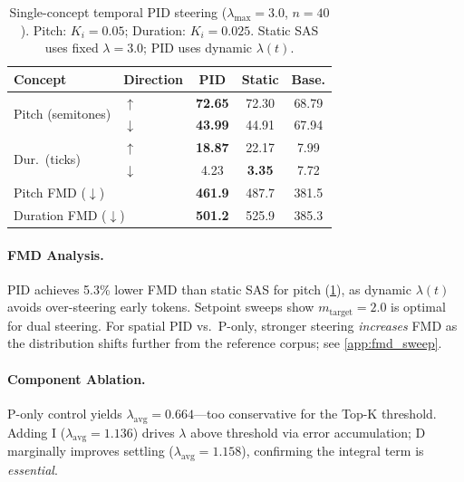 \documentclass{article}
\theoremstyle{plain}
\begin{document}
\begin{table}[t]
  \caption{Single-concept temporal PID steering ($\lambda_\text{max}{=}3.0$, $n{=}40$). Pitch: $K_i{=}0.05$; Duration: $K_i{=}0.025$. Static SAS uses fixed $\lambda{=}3.0$; PID uses dynamic $\lambda(t)$.}
  \label{tab:single}
  \begin{center}
  \begin{small}
  \begin{tabular}{llccc}
    \toprule
    Concept & Direction & PID & Static & Base. \\
    \midrule
    \multirow{2}{*}{Pitch (semitones)} & $\uparrow$ & \textbf{72.65} & 72.30 & 68.79 \\
    & $\downarrow$ & \textbf{43.99} & 44.91 & 67.94 \\
    \multirow{2}{*}{Dur.\ (ticks)} & $\uparrow$ & \textbf{18.87} & 22.17 & 7.99 \\
    & $\downarrow$ & 4.23 & \textbf{3.35} & 7.72 \\
    \midrule
    \multicolumn{2}{l}{Pitch FMD ($\downarrow$)} & \textbf{461.9} & 487.7 & 381.5 \\
    \multicolumn{2}{l}{Duration FMD ($\downarrow$)} & \textbf{501.2} & 525.9 & 385.3 \\
    \bottomrule
  \end{tabular}
  \end{small}
  \end{center}
  \vskip -0.1in
\end{table}

\paragraph{FMD Analysis.}
PID achieves 5.3\% lower FMD than static SAS for pitch (\cref{tab:single}), as dynamic $\lambda(t)$ avoids over-steering early tokens. Setpoint sweeps show $m_\text{target}{=}2.0$ is optimal for dual steering. For spatial PID vs.\ P-only, stronger steering \emph{increases} FMD as the distribution shifts further from the reference corpus; see \cref{app:fmd_sweep}.


\paragraph{Component Ablation.}
\label{sec:ablation}
P-only control yields $\lambda_\text{avg}{=}0.664$---too conservative for the Top-K threshold. Adding I ($\lambda_\text{avg}{=}1.136$) drives $\lambda$ above threshold via error accumulation; D marginally improves settling ($\lambda_\text{avg}{=}1.158$), confirming the integral term is \emph{essential}.
\end{document}
